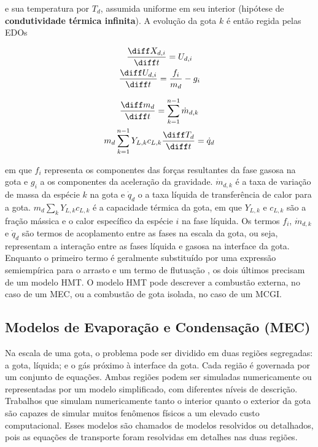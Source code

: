 e sua temperatura por $T_d$, assumida uniforme em seu interior (hipótese de \textbf{condutividade térmica infinita}).
A evolução da gota $k$ é então regida pelas EDOs \cite{JennyB2012}

\begin{minipage}{0.4\linewidth}
    \begin{gather}
        \frac{\diff X_{d,i}}{\diff t} = U_{d,i}
        \label{eq:Ud} \\
        \frac{\diff U_{d,i}}{\diff t} =
        \frac{f_i}{ m_{d}} -
        g_i 
        \label{eq:Xd}
    \end{gather}
\end{minipage}
\begin{minipage}{0.55\linewidth}
    \begin{gather}
        \frac{\diff m_{d}}{\diff t} = \sum_{k=1}^{n-1} \dot m_{d,k}
        \label{eq:md} \\
        m_d \sum_{k=1}^{n-1} Y_{L,k} c_{L,k} \frac{\diff T_d}{\diff t} = \dot q_d
        \label{eq:Td}
    \end{gather}
\end{minipage}

em que $f_i$ representa os componentes das forças resultantes da fase gasosa na gota e $g_i$ a os componentes da aceleração da gravidade.
$\dot m_{d,k}$ é a taxa de variação de massa da espécie $k$ na gota e $\dot q_d$ o a taxa líquida de transferência de calor para a gota.
$ m_d \sum_k Y_{L,k} c_{L,k}$ é a capacidade térmica da gota, em que 
$Y_{L,k}$ e $c_{L,k}$ são a fração mássica e o calor específico da  espécie $i$ na fase líquida.
Os termos $f_i$, $\dot m_{d,k}$ e $\dot q_d$ são termos de acoplamento entre as fases na escala da gota, ou seja, representam a interação entre as fases líquida e gasosa na interface da gota.
Enquanto o primeiro termo é geralmente substituído por uma expressão semiempírica para o arrasto e um termo de flutuação \cite[p. 16]{JennyB2012}, os dois últimos precisam de um modelo HMT.
O modelo HMT pode descrever a combustão externa, no caso de um MEC, ou a combustão de gota isolada, no caso de um MCGI.  



\subsection{Modelos de Evaporação e Condensação (MEC)} \label{sec:MEC}

Na escala de uma gota, o problema pode ser dividido em duas regiões segregadas: a gota, líquida; e o gás próximo à interface da gota. 
Cada região é governada por um conjunto de equações.
Ambas regiões podem ser simuladas numericamente ou representadas por um modelo simplificado, com diferentes níveis de descrição.
Trabalhos que simulam numericamente tanto o interior quanto o exterior da gota são capazes de simular muitos fenômenos físicos a um elevado custo computacional.
Esses modelos são chamados de modelos resolvidos ou detalhados, pois as equações de transporte foram resolvidas em detalhes nas duas regiões.

